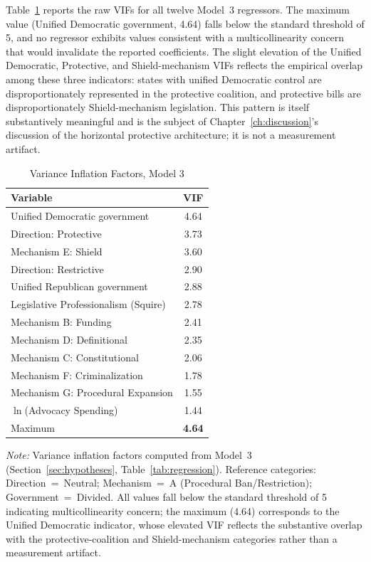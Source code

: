 \documentclass[12pt]{report}
\begin{document}
Table~\ref{tab:vif_model3} reports the raw VIFs for all twelve Model~3 regressors. The
maximum value (Unified Democratic government, 4.64) falls below the standard threshold
of 5, and no regressor exhibits values consistent with a multicollinearity concern that
would invalidate the reported coefficients. The slight elevation of the Unified
Democratic, Protective, and Shield-mechanism VIFs reflects the empirical overlap among
these three indicators: states with unified Democratic control are disproportionately
represented in the protective coalition, and protective bills are disproportionately
Shield-mechanism legislation. This pattern is itself substantively meaningful and is
the subject of Chapter~\ref{ch:discussion}'s discussion of the horizontal protective
architecture; it is not a measurement artifact.

\begin{table}[htbp]
\centering
\caption{Variance Inflation Factors, Model 3}
\label{tab:vif_model3}
\begin{threeparttable}
\begin{tabular}{lc}
\toprule
Variable & VIF \\
\midrule
Unified Democratic government        & 4.64 \\
Direction: Protective                & 3.73 \\
Mechanism E: Shield                  & 3.60 \\
Direction: Restrictive               & 2.90 \\
Unified Republican government        & 2.88 \\
Legislative Professionalism (Squire) & 2.78 \\
Mechanism B: Funding                 & 2.41 \\
Mechanism D: Definitional            & 2.35 \\
Mechanism C: Constitutional          & 2.06 \\
Mechanism F: Criminalization         & 1.78 \\
Mechanism G: Procedural Expansion    & 1.55 \\
$\ln$(Advocacy Spending)             & 1.44 \\
\midrule
Maximum                              & \textbf{4.64} \\
\bottomrule
\end{tabular}
\begin{tablenotes}
\footnotesize
\item \textit{Note:} Variance inflation factors computed from Model~3
  (Section~\ref{sec:hypotheses}, Table~\ref{tab:regression}). Reference categories:
  Direction~=~Neutral; Mechanism~=~A (Procedural Ban/Restriction); Government~=~Divided.
  All values fall below the standard threshold of 5 indicating multicollinearity concern;
  the maximum (4.64) corresponds to the Unified Democratic indicator, whose elevated VIF
  reflects the substantive overlap with the protective-coalition and Shield-mechanism
  categories rather than a measurement artifact.
\end{tablenotes}
\end{threeparttable}
\end{table}
\end{document}
